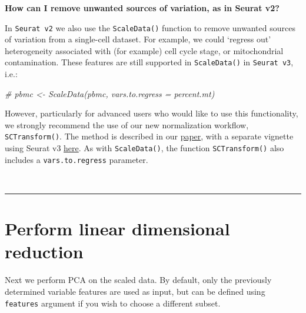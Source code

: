 \documentclass[
]{book}
\newenvironment{Shaded}{\begin{snugshade}}{\end{snugshade}}
\newcommand{\CommentTok}[1]{\textcolor[rgb]{0.56,0.35,0.01}{\textit{#1}}}
\begin{document}
\textbf{How can I remove unwanted sources of variation, as in Seurat v2?}

In \texttt{Seurat\ v2} we also use the \texttt{ScaleData()} function to remove unwanted sources of variation from a single-cell dataset. For example, we could `regress out' heterogeneity associated with (for example) cell cycle stage, or mitochondrial contamination. These features are still supported in \texttt{ScaleData()} in \texttt{Seurat\ v3}, i.e.:

\begin{Shaded}
\begin{Highlighting}[]
\CommentTok{\# pbmc \textless{}{-} ScaleData(pbmc, vars.to.regress = \textquotesingle{}percent.mt\textquotesingle{})}
\end{Highlighting}
\end{Shaded}

However, particularly for advanced users who would like to use this functionality, we strongly recommend the use of our new normalization workflow, \texttt{SCTransform()}. The method is described in our \href{https://genomebiology.biomedcentral.com/articles/10.1186/s13059-019-1874-1}{paper}, with a separate vignette using Seurat v3 \href{sctransform_vignette.html}{here}. As with \texttt{ScaleData()}, the function \texttt{SCTransform()} also includes a \texttt{vars.to.regress} parameter.

~

\begin{center}\rule{0.5\linewidth}{0.5pt}\end{center}

\hypertarget{perform-linear-dimensional-reduction}{%
\section{Perform linear dimensional reduction}\label{perform-linear-dimensional-reduction}}

Next we perform PCA on the scaled data. By default, only the previously determined variable features are used as input, but can be defined using \texttt{features} argument if you wish to choose a different subset.
\end{document}
